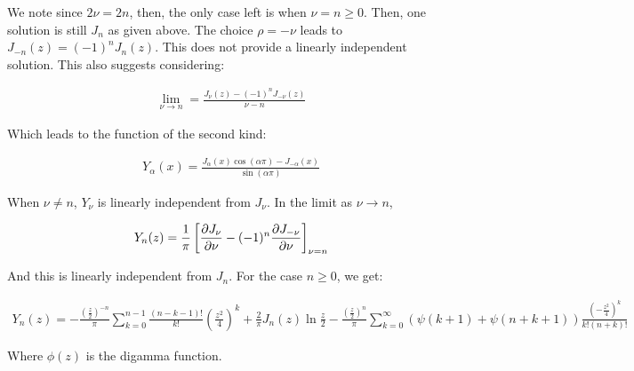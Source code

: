 \documentclass{article}
\theoremstyle{definition}
\begin{document}
We note since $2\nu = 2n$, then, the only case left is when $\nu = n \geq 0$. Then, one solution is still $J_n$ as given above. The choice $\rho=-\nu$ leads to $J_{-n}(z) = (-1)^n J_n(z)$. This does not provide a linearly independent solution.  This also suggests considering:

\begin{align*}
\lim_{\nu\to n} = \frac{J_\nu(z) - (-1)^nJ_{-\nu}(z)}{\nu-n}
\end{align*}

Which leads to the function of the second kind:

\begin{align*}
Y_{\alpha }(x)={\frac {J_{\alpha }(x)\cos(\alpha \pi )-J_{-\alpha }(x)}{\sin(\alpha \pi )}}
\end{align*}


When $\nu \neq n$, $Y_\nu$ is linearly independent from $J_\nu$. In the limit as $\nu \to n$, 

\begin{align*}
Y_n(z) = \frac{1}{\pi}  \left[\pdv{J_\nu}{\nu} - (-1)^n \pdv{J_{-\nu}}{\nu}  \right]_{\nu=n}
\end{align*}

And this is linearly independent from $J_n$. For the case $n\geq 0$, we get:

\begin{align*}
 Y_{n}(z)=-{\frac {\left({\frac {z}{2}}\right)^{-n}}{\pi }}\sum _{k=0}^{n-1}{\frac {(n-k-1)!}{k!}}\left({\frac {z^{2}}{4}}\right)^{k}+{\frac {2}{\pi }}J_{n}(z)\ln {\frac {z}{2}}-{\frac {\left({\frac {z}{2}}\right)^{n}}{\pi }}\sum _{k=0}^{\infty }(\psi (k+1)+\psi (n+k+1)){\frac {\left(-{\frac {z^{2}}{4}}\right)^{k}}{k!(n+k)!}}
\end{align*}

Where $\phi(z)$ is the digamma function.

\end{document}
